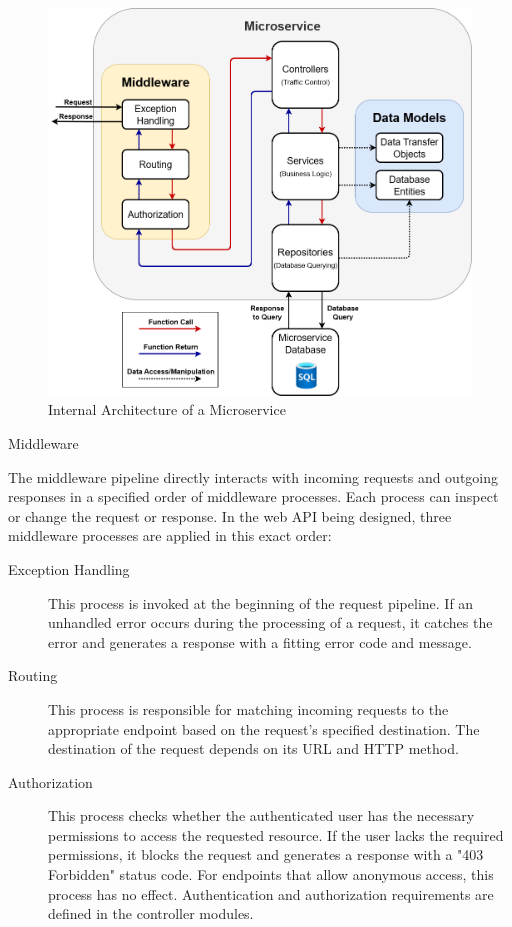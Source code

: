 \documentclass[12pt, reqno]{amsbook}
\makeatletter
\def\subsection{\@startsection{subsection}{2}%
      \z@{.5\linespacing\@plus.7\linespacing}{.25\linespacing}%
      {\normalfont\bfseries\flushleft}}
\theoremstyle{definition}
\theoremstyle{definition}
\numberwithin{section}{chapter}
\numberwithin{table}{chapter}
\numberwithin{figure}{chapter}
\makeatother
\begin{document}
\begin{figure}[H]
  \centering
  \includegraphics[width=1\linewidth]{images/InternalMicroserviceArchitecture.png}
  \caption{\label{Figure:InternalMicroserviceArchitecture}Internal Architecture of a Microservice}
\end{figure}

\subsection{Middleware}
\label{Subsection:Middleware}

The middleware pipeline directly interacts with incoming requests and outgoing responses in a specified order of middleware processes. Each process can inspect or change the request or response. In the web \ac{API} being designed, three middleware processes are applied in this exact order:

\begin{description}
  \item[Exception Handling] This process is invoked at the beginning of the request pipeline. If an unhandled error occurs during the processing of a request, it catches the error and generates a response with a fitting error code and message.
  \item[Routing] This process is responsible for matching incoming requests to the appropriate endpoint based on the request's specified destination. The destination of the request depends on its \Ac{URL} and \ac{HTTP} method.
  \item[Authorization] This process checks whether the authenticated user has the necessary permissions to access the requested resource. If the user lacks the required permissions, it blocks the request and generates a response with a "403 Forbidden" status code. For endpoints that allow anonymous access, this process has no effect. Authentication and authorization requirements are defined in the controller modules.
\end{description}
\end{document}
